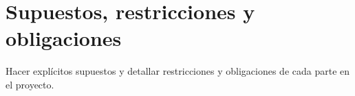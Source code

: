 \section{Supuestos, restricciones y obligaciones}

Hacer explícitos supuestos y detallar restricciones y obligaciones de cada parte en el proyecto.